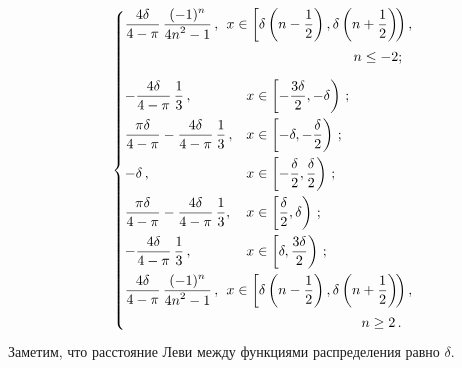 \begin{multicols}{2}
\begin{multline*}
\begin{cases}
    \fr{4 \delta }{4-\pi} \,\fr{(-1)^n}{4n^2 - 1 }\,,
    &\hspace*{-5mm} x\in \left[\delta\left(n-\fr{1}{2}\right),\delta\left(n+\fr{1}{2}\right)\!\right),\hspace*{-5.40523pt}\\[9pt]
    &\hspace*{27mm}  n \le -2 ; \\[9pt]
    - \fr{4 \delta }{4-\pi} \,\fr{1}{3}\,,
    & x\in \left[ -\fr{3\delta}{2},-\delta\right)\,; \\[9pt]
    \fr{ \pi \delta}{4-\pi} - \fr{4 \delta }{4-\pi} \,\fr{1}{3}\,,
    & x\in \left[  -\delta, -\fr{ \delta}{2}\right)\,; \\[9pt]
    -\delta\,,
    & x\in \left[-\fr{ \delta}{2}, \fr{\delta}{2}\right)\,; \\[9pt]
    \fr{ \pi \delta}{4-\pi} - \fr{4 \delta }{4-\pi} \,\fr{1}{3},
    & x\in \left[ \fr{ \delta}{2}, \delta\right)\,; \\[9pt]
    - \fr{4 \delta }{4-\pi} \,\fr{1}{3}\,,
    & x\in \left[\delta, \fr{3\delta}{2}\right)\,; \\[9pt]
    \fr{4 \delta }{4-\pi} \,\fr{(-1)^n}{4n^2 - 1 }\,,
    & \hspace*{-5mm}x\in \left[\delta\left(n-\fr{1}{2}\right),\delta\left(n+\fr{1}{2}\right)\!\right),\hspace*{-5.40523pt}\\[9pt]
    &\hspace*{29mm}  n \ge 2\,. 
\end{cases}
\end{multline*}
Заметим, что расстояние Леви между функциями распределения равно
$\delta$.


\end{multicols}
